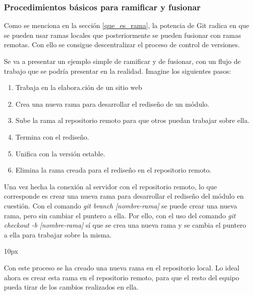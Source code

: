 \subsubsection{Procedimientos básicos para ramificar y fusionar}

Como se menciona en la sección \ref{que_es_rama}, la potencia de Git radica en que se pueden usar ramas locales que posteriormente se pueden fusionar con ramas remotas. Con ello se consigue descentralizar el proceso de control de versiones.

Se va a presentar un ejemplo simple de ramificar y de fusionar, con un flujo de trabajo que se podría presentar en la realidad. Imagine los siguientes pasos:

\begin{enumerate}
	\item{Trabaja en la elabora.ción de un sitio web}
	\item{Crea una nueva rama para desarrollar el rediseño de un módulo.}
	\item{Sube la rama al repositorio remoto para que otros puedan trabajar sobre ella.}
	\item{Termina con el rediseño.}
	\item{Unifica con la versión estable.}
	\item{Elimina la rama creada para el rediseño en el repositorio remoto.}
\end{enumerate}

Una vez hecha la conexión al servidor con el repositorio remoto, lo que corresponde es crear una nueva rama para desarrollar el rediseño del módulo en cuestión. Con el comando {\it git branch [nombre-rama]} se puede crear una nueva rama, pero sin cambiar el puntero a ella. Por ello, con el uso del comando {\it git checkout -b [nombre-rama]} sí que se crea una nueva rama y se cambia el puntero a ella para trabajar sobre la misma.

\begin{center}{
	\fboxsep 10px
	}
\end{center}

Con este proceso se ha creado una nueva rama en el repositorio local. Lo ideal ahora es crear esta rama en el repositorio remoto, para que el resto del equipo pueda tirar de los cambios realizados en ella. 

